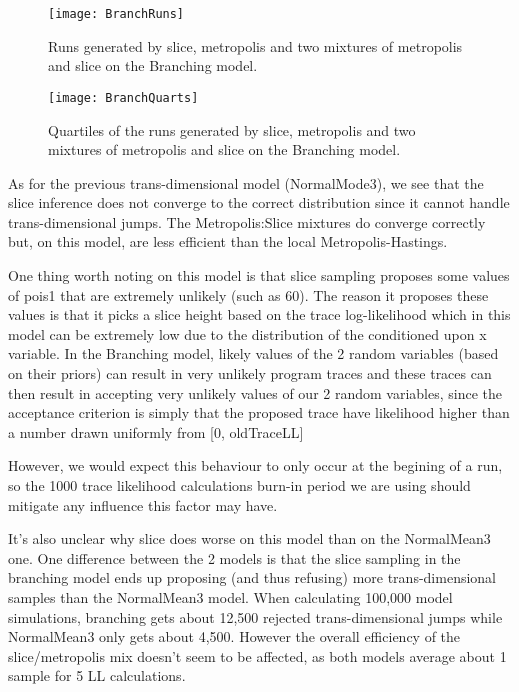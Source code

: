 \begin{figure}[H]
    \centering
    \texttt{[image: BranchRuns]}
    \caption{Runs generated by slice, metropolis and two mixtures of metropolis and slice on the Branching model.}
    \label{fig:BranchRuns}
\end{figure}

\begin{figure}[H]
    \centering
    \texttt{[image: BranchQuarts]}
    \caption{Quartiles of the runs generated by slice, metropolis and two mixtures of metropolis and slice on the Branching model.}
    \label{fig:BranchQuarts}
\end{figure}

As for the previous trans-dimensional model (NormalMode3), we see that the slice inference does not converge to the correct distribution since it cannot handle trans-dimensional jumps. The Metropolis:Slice mixtures do converge correctly but, on this model, are less efficient than the local Metropolis-Hastings.

One thing worth noting on this model is that slice sampling proposes some values of pois1 that are extremely unlikely (such as 60). The reason it proposes these values is that it picks a slice height based on the trace log-likelihood which in this model can be extremely low due to the distribution of the conditioned upon x variable. In the Branching model, likely values of the 2 random variables (based on their priors) can result in very unlikely program traces and these traces can then result in accepting very unlikely values of our 2 random variables, since the acceptance criterion is simply that the proposed trace have likelihood higher than a number drawn uniformly from [0, oldTraceLL]

However, we would expect this behaviour to only occur at the begining of a run, so the 1000 trace likelihood calculations burn-in period we are using should mitigate any influence this factor may have.

It's also unclear why slice does worse on this model than on the NormalMean3 one. One difference between the 2 models is that the slice sampling in the branching model ends up proposing (and thus refusing) more trans-dimensional samples than the NormalMean3 model. When calculating 100,000 model simulations, branching gets about 12,500 rejected trans-dimensional jumps while NormalMean3 only gets about 4,500. However the overall efficiency of the slice/metropolis mix doesn't seem to be affected, as both models average about 1 sample for 5 LL calculations. 

